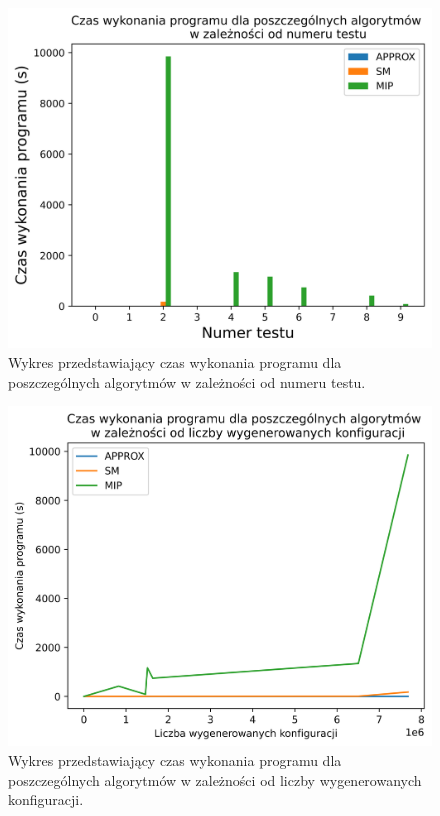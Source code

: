\begin{figure}[H]
	\begin{center}
		\includegraphics[width=12cm]{plots/time}
		\caption{Wykres przedstawiający czas wykonania programu dla poszczególnych algorytmów w zależności od numeru testu.}
	\end{center}
\end{figure}

\begin{figure}[H]
	\begin{center}
		\includegraphics[width=12cm]{plots/time_configs}
		\caption{Wykres przedstawiający czas wykonania programu dla poszczególnych algorytmów w zależności od liczby wygenerowanych konfiguracji.}
	\end{center}
\end{figure}


